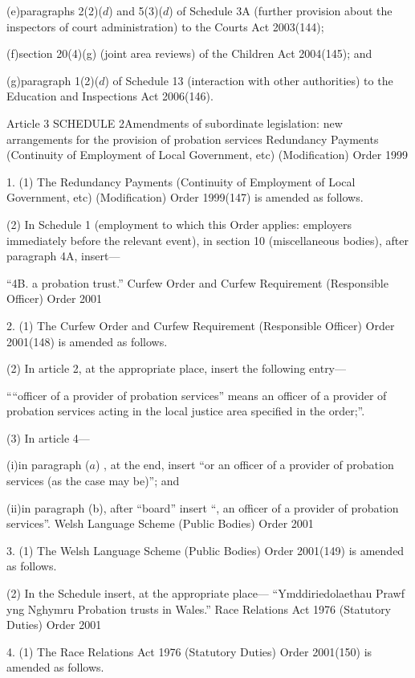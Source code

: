 \documentclass[12pt,a4paper]{article}
\begin{document}
(e)paragraphs 2(2)($d$)  and 5(3)($d$)  of Schedule 3A (further provision about the inspectors of court administration) to the Courts Act 2003(144);

(f)section 20(4)(g) (joint area reviews) of the Children Act 2004(145); and

(g)paragraph 1(2)($d$)  of Schedule 13 (interaction with other authorities) to the Education and Inspections Act 2006(146).

Article 3
SCHEDULE 2Amendments of subordinate legislation: new arrangements for the provision of probation services
Redundancy Payments (Continuity of Employment of Local Government, etc) (Modification) Order 1999

1.  (1)  The Redundancy Payments (Continuity of Employment of Local Government, etc) (Modification) Order 1999(147) is amended as follows.

(2) In Schedule 1 (employment to which this Order applies: employers immediately before the relevant event), in section 10 (miscellaneous bodies), after paragraph 4A, insert—

“4B.  a probation trust.”
Curfew Order and Curfew Requirement (Responsible Officer) Order 2001

2.  (1)  The Curfew Order and Curfew Requirement (Responsible Officer) Order 2001(148) is amended as follows.

(2) In article 2, at the appropriate place, insert the following entry—

““officer of a provider of probation services” means an officer of a provider of probation services acting in the local justice area specified in the order;”.

(3) In article 4—

(i)in paragraph ($a$) , at the end, insert “or an officer of a provider of probation services (as the case may be)”; and

(ii)in paragraph (b), after “board” insert “, an officer of a provider of probation services”.
Welsh Language Scheme (Public Bodies) Order 2001

3.  (1)  The Welsh Language Scheme (Public Bodies) Order 2001(149) is amended as follows.

(2) In the Schedule insert, at the appropriate place—
“Ymddiriedolaethau Prawf yng Nghymru	Probation trusts in Wales.”
Race Relations Act 1976 (Statutory Duties) Order 2001

4.  (1)  The Race Relations Act 1976 (Statutory Duties) Order 2001(150) is amended as follows.
\end{document}
